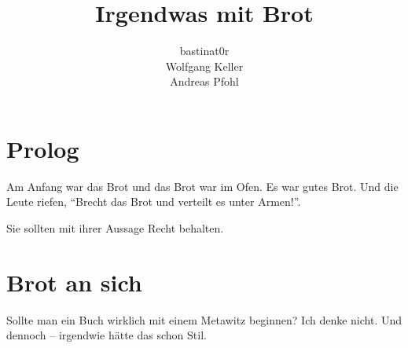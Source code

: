 \documentclass{book}
\title{Irgendwas mit Brot}
\author{bastinat0r \\ Wolfgang Keller \\ Andreas Pfohl}
\begin{document}
\maketitle

\chapter*{Prolog}
Am Anfang war das Brot und das Brot war im Ofen. Es war gutes Brot. Und die Leute riefen, "`Brecht das Brot und verteilt es unter Armen!"'.

Sie sollten mit ihrer Aussage Recht behalten.

\chapter{Brot an sich}
Sollte man ein Buch wirklich mit einem Metawitz beginnen? Ich denke nicht. Und
dennoch – irgendwie hätte das schon Stil.
\end{document}
